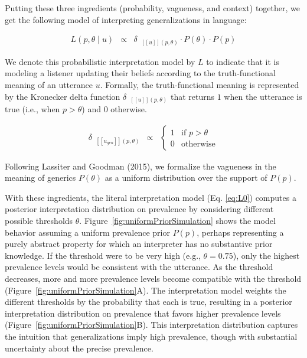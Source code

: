 \documentclass[english,,man,floatsintext]{apa6}
\theoremstyle{definition}
\theoremstyle{definition}
\theoremstyle{definition}
\theoremstyle{remark}
\begin{document}
Putting these three ingredients (probability, vagueness, and context)
together, we get the following model of interpreting generalizations in
language:

\begin{eqnarray}
L(p, \theta \mid u) &\propto& {\delta_{\mbox{ $[\![ u ]\!]$}(p, \theta)}  \cdot P(\theta) \cdot P(p)} \label{eq:L0}
\end{eqnarray}

We denote this probabilistic interpretation model by \(L\) to indicate
that it is modeling a listener updating their beliefs according to the
truth-functional meaning of an utterance \(u\). Formally, the
truth-functional meaning is represented by the Kronecker delta function
\(\delta_{\mbox{ $[\![ u ]\!]$}(p, \theta)}\) that returns \(1\) when
the utterance is true (i.e., when \(p > \theta\)) and \(0\) otherwise.

\begin{eqnarray}
\delta_{\mbox{ $[\![ u_{gen} ]\!]$}(p, \theta)} &\propto  & \begin{cases}
1 & \text{if } p > \theta \\
0 & \text{otherwise}
\end{cases}\label{eq:delta}
\end{eqnarray}

Following Lassiter and Goodman (2015), we formalize the vagueness in the
meaning of generics \(P(\theta)\) as a uniform distribution over the
support of \(P(p)\).

With these ingredients, the literal interpretation model (Eq.
\ref{eq:L0}) computes a posterior interpretation distribution on
prevalence by considering different possible thresholds \(\theta\).
Figure~\ref{fig:uniformPriorSimulation} shows the model behavior
assuming a uniform prevalence prior \(P(p)\), perhaps representing a
purely abstract property for which an interpreter has no substantive
prior knowledge. If the threshold were to be very high (e.g.,
\(\theta = 0.75\)), only the highest prevalence levels would be
consistent with the utterance. As the threshold decreases, more and more
prevalence levels become compatible with the threshold
(Figure~\ref{fig:uniformPriorSimulation}A). The interpretation model
weights the different thresholds by the probability that each is true,
resulting in a posterior interpretation distribution on prevalence that
favors higher prevalence levels
(Figure~\ref{fig:uniformPriorSimulation}B). This interpretation
distribution captures the intuition that generalizations imply high
prevalence, though with substantial uncertainty about the precise
prevalence.
\end{document}
